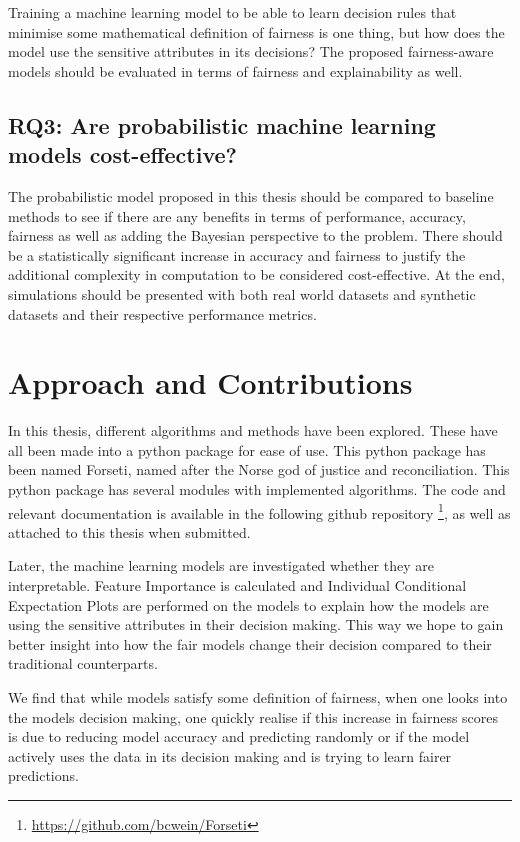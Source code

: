 Training a machine learning model to be able to learn decision rules that minimise some mathematical definition of fairness is one thing, but how does the model use the sensitive attributes in its decisions? The proposed fairness-aware models should be evaluated in terms of fairness and explainability as well. 

\subsection{RQ3: Are probabilistic machine learning models cost-effective?}

The probabilistic model proposed in this thesis should be compared to baseline methods to see if there are any benefits in terms of performance, accuracy, fairness as well as adding the Bayesian perspective to the problem. There should be a statistically significant increase in accuracy and fairness to justify the additional complexity in computation to be considered cost-effective. At the end, simulations should be presented with both real world datasets and synthetic datasets and their respective performance metrics.

\section{Approach and Contributions}
\label{sec:intro:approach}

In this thesis, different algorithms and methods have been explored. These have all been made into a python package for ease of use. This python package has been named Forseti, named after the Norse god of justice and reconciliation. This python package has several modules with implemented algorithms. The code and relevant documentation is available in the following github repository \footnote{\url{https://github.com/bcwein/Forseti}}, as well as attached to this thesis when submitted.

Later, the machine learning models are investigated whether they are interpretable. Feature Importance is calculated and Individual Conditional Expectation Plots are performed on the models to explain how the models are using the sensitive attributes in their decision making. This way we hope to gain better insight into how the fair models change their decision compared to their traditional counterparts.

We find that while models satisfy some definition of fairness, when one looks into the models decision making, one quickly realise if this increase in fairness scores is due to reducing model accuracy and predicting randomly or if the model actively uses the data in its decision making and is trying to learn fairer predictions. 

